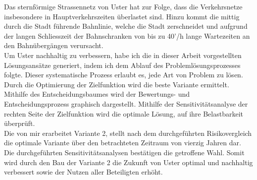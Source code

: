 Das sternförmige Strassennetz von Uster hat zur Folge, dass die Verkehrsnetze insbesondere in Hauptverkehrszeiten überlastet sind. Hinzu kommt die mittig durch die Stadt führende Bahnlinie, welche die Stadt zerschneidet und aufgrund der langen Schliesszeit der Bahnschranken von bis zu 40’/h lange Wartezeiten an den Bahnübergängen verursacht. \\
Um Uster nachhaltig zu verbessern, habe ich die in dieser Arbeit vorgestellten Lösungsansätze generiert, indem ich dem Ablauf des Problemlösungsprozesses folgte. Dieser systematische Prozess erlaubt es, jede Art von Problem zu lösen. Durch die Optimierung der Zielfunktion wird die beste Variante ermittelt. Mithilfe des Entscheidungsbaumes wird der Bewertungs- und Entscheidungsprozess graphisch dargestellt. Mithilfe der Sensitivitätsanalyse der rechten Seite der Zielfunktion wird die optimale Lösung, auf ihre Belastbarkeit überprüft. \\

Die von mir erarbeitet Variante 2, stellt nach dem durchgeführten Risikovergleich die optimale Variante über den betrachteten Zeitraum von vierzig Jahren dar. Die durchgeführten Sensitivitätsanalysen bestätigen die getroffene Wahl. Somit wird durch den Bau der Variante 2 die Zukunft von Uster optimal und nachhaltig verbessert sowie der Nutzen aller Beteiligten erhöht. 



 



 



%

